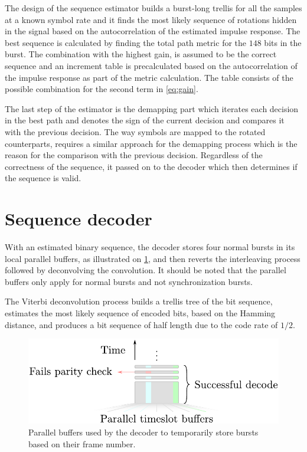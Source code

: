The design of the sequence estimator builds a burst-long trellis for
all the samples at a known symbol rate and it finds the most likely
sequence of rotations hidden in the signal based on the
autocorrelation of the estimated impulse response. The best sequence
is calculated by finding the total path metric for the $148$ bits in
the burst. The combination with the highest gain, is assumed to be the
correct sequence and an increment table is precalculated based on the
autocorrelation of the impulse response as part of the metric
calculation. The table consists of the possible combination for the
second term in \cref{eq:gain}.

The last step of the estimator is the demapping part which iterates
each decision in the best path and denotes the sign of the current
decision and compares it with the previous decision. The way symbols
are mapped to the rotated counterparts, requires a similar approach
for the demapping process which is the reason for the comparison with
the previous decision. Regardless of the correctness of the sequence,
it passed on to the decoder which then determines if the sequence is
valid.

\section{Sequence decoder}
With an estimated binary sequence, the decoder stores four normal
bursts in its local parallel buffers, as illustrated on
\cref{fig:burst_buffer}, and then reverts the interleaving process
followed by deconvolving the convolution. It should be noted that the
parallel buffers only apply for normal bursts and not synchronization
bursts.

The Viterbi deconvolution process builds a trellis tree of the bit
sequence, estimates the most likely sequence of encoded bits, based on
the Hamming distance, and produces a bit sequence of half length due
to the code rate of $1/2$.

\begin{figure}
  \centering
  \includegraphics[width=\textwidth]{figures/burst_buffer}
  \caption{Parallel buffers used by the decoder to temporarily store
    bursts based on their frame number.}
  \label{fig:burst_buffer}
\end{figure}

